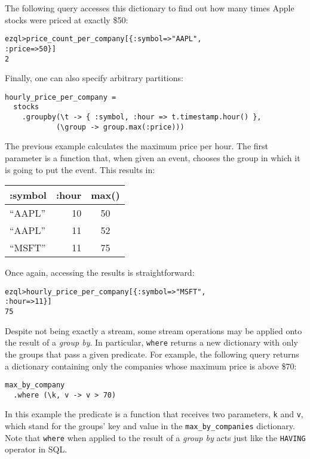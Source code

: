 \documentclass{report}
\newenvironment{evaluation}
{
  \framed
  \begin{alltt}
}
{
  \end{alltt}
  \endframed
}
\begin{document}
The following query accesses this dictionary to find out how many
times Apple stocks were priced at exactly \$50:

\begin{evaluation}
  ezql> price_count_per_company[\{ :symbol => "AAPL",
                                  :price => 50 \}]
  2
\end{evaluation}

Finally, one can also specify arbitrary partitions:

\begin{verbatim}
hourly_price_per_company =
  stocks
    .groupby(\t -> { :symbol, :hour => t.timestamp.hour() },
            (\group -> group.max(:price)))
\end{verbatim}

The previous example calculates the maximum price per hour. The first
parameter is a function that, when given an event, chooses the group
in which it is going to put the event. This results in:

\begin{tabular}{ |l|r|c| }
  \hline
  :symbol & :hour & max() \\
  \hline
  ``AAPL'' & 10 & 50 \\
  ``AAPL'' & 11 & 52 \\
  ``MSFT'' & 11 & 75 \\
  \hline
\end{tabular}

Once again, accessing the results is straightforward:

\begin{evaluation}
ezql> hourly_price_per_company[\{ :symbol => "MSFT",
                                 :hour   => 11 \}]
75
\end{evaluation}

Despite not being exactly a stream, some stream operations may be
applied onto the result of a \emph{group by}. In particular,
\verb=where= returns a new dictionary with only the groups that pass a
given predicate. For example, the following query returns a dictionary
containing only the companies whose maximum price is above \$70:

\begin{verbatim}
max_by_company
  .where (\k, v -> v > 70)
\end{verbatim}

In this example the predicate is a function that receives two
parameters, \verb=k= and \verb=v=, which stand for the groups' key and
value in the \verb=max_by_companies= dictionary. Note that
\verb=where= when applied to the result of a \emph{group by} acts just
like the \verb=HAVING= operator in SQL.
\end{document}
